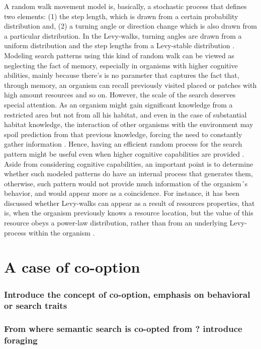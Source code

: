 \documentclass[11pt]{article}
\begin{document}
A random walk movement model is, basically, a stochastic process that defines
two elements: (1) the step length, which is drawn from a certain probability
distribution and, (2) a turning angle or direction change which is also drawn
from a particular distribution. In the Levy-walks, turning angles are drawn from
a uniform distribution and the step lengths from a Levy-stable distribution
\citep{bartumeusLEVYPROCESSESANIMAL2007a}. Modeling search patterns using this
kind of random walk can be viewed as neglecting the fact of memory, especially
in organisms with higher cognitive abilities, mainly because there’s is no
parameter that captures the fact that, through memory, an organism can recall
previously visited placed or patches with high amount resources and so on.
However, the scale of the search deserves special attention. As an organism
might gain significant knowledge from a restricted area but not from all his
habitat, and even in the case of substantial habitat knowledge, the interaction
of other organisms with the environment may spoil prediction from that previous
knowledge, forcing the need to constantly gather information
\citep{patrickBoldnessPredictsIndividual2017}. Hence, having an efficient random
process for the search pattern might be useful even when higher cognitive
capabilities are provided \citep{bartumeusLEVYPROCESSESANIMAL2007a}. Aside from
considering cognitive capabilities, an important point is to determine whether
such modeled patterns do have an internal process that generates them,
otherwise, such pattern would not provide much information of the organism´s
behavior, and would appear more as a coincidence. For instance, it has been
discussed whether Levy-walks can appear as a result of resources properties,
that is, when the organism previously knows a resource location, but the value
of this resource obeys a power-law distribution, rather than from an underlying
Levy-process within the organism \citep{benhamouHOWMANYANIMALS2007}.

\newpage
\section{A case of co-option}
\label{sec:org47ad16e}
\subsubsection{Introduce the concept of co-option, emphasis on behavioral or search traits}
\label{sec:org9d51dc7}
\subsubsection{From where semantic search is co-opted from ? introduce foraging}
\label{sec:orge78dc8c}
\end{document}
